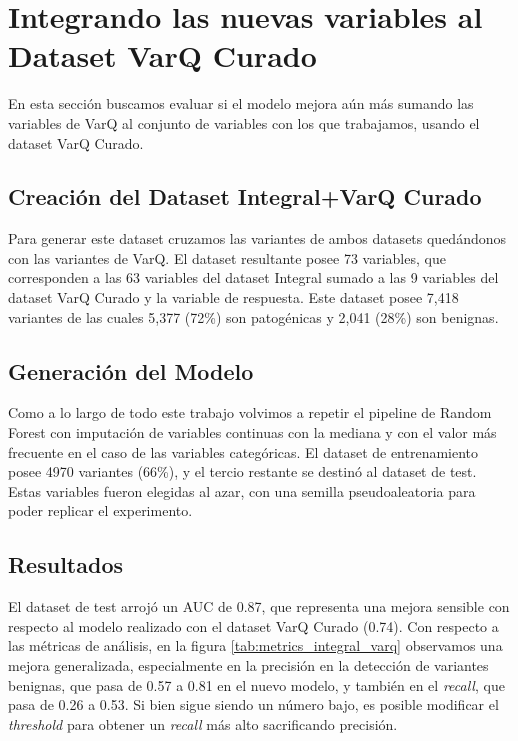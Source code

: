 \begin{figure}[H]
\end{figure}

\section{Integrando las nuevas variables al Dataset VarQ Curado}
En esta sección buscamos evaluar si el modelo mejora aún más sumando las variables de VarQ al conjunto de variables con los que trabajamos, usando el dataset VarQ Curado.

\subsection{Creación del Dataset Integral+VarQ Curado}
Para generar este dataset cruzamos las variantes de ambos datasets quedándonos con las variantes de VarQ. El dataset resultante posee 73 variables, que corresponden a las 63 variables del dataset Integral sumado a las 9 variables del dataset VarQ Curado y la variable de respuesta. Este dataset posee 7,418 variantes de las cuales 5,377 (72\%) son patogénicas y 2,041 (28\%) son benignas. 
\subsection{Generación del Modelo}
Como a lo largo de todo este trabajo volvimos a repetir el pipeline de Random Forest con imputación de variables continuas con la mediana y con el valor más frecuente en el caso de las variables categóricas. El dataset de entrenamiento posee 4970 variantes (66\%), y el tercio restante se destinó al dataset de test. Estas variables fueron elegidas al azar, con una semilla pseudoaleatoria para poder replicar el experimento.  

\subsection{Resultados}
El dataset de test arrojó un AUC de 0.87, que representa una mejora sensible con respecto al modelo realizado con el dataset VarQ Curado (0.74). Con respecto a las métricas de análisis, en la figura \ref{tab:metrics_integral_varq} observamos una mejora generalizada, especialmente en la precisión en la detección de variantes benignas, que pasa de 0.57 a 0.81 en el nuevo modelo, y también en el \textit{recall}, que pasa de 0.26 a 0.53. Si bien sigue siendo un número bajo, es posible modificar el \textit{threshold} para obtener un \textit{recall} más alto sacrificando precisión. 

